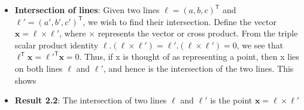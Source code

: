 \documentclass{report}
\begin{document}
\begin{itemize}
            \begin{align*}
                [a,b,c,] = a \cdot (b\times c)
            \end{align*}
            is called the \textbf{scalar triple product}. Its absolute value equals the volume of the parallelepiped spanned by $a,b,c$. We have
            \begin{align*}
                a \cdot (b\times c) = b \cdot (c\times a) = c \cdot (a\times b)
            .\end{align*}
            Further,
            \begin{align*}
                a \cdot (b\times c) = -b \cdot (a\times c) = -c \cdot (b\times a) = -a \cdot (c \times b)
            ,\end{align*}
            and 
            \begin{align*}
                [a,b,c] = 0
            \end{align*}
            if any two vectors are equal parallel, or if $a,b,c$ are coplanar. 
            \bigbreak \noindent 
            Lastly, we have that
            \begin{align*}
                [a,b,c] = \det \begin{pmatrix} a^{T} \\ b^{T} \\ c^{T} \end{pmatrix} = \det \begin{pmatrix} a_{1} & a_{2} & a_{3} \\ b_{1} & b_{2} & b_{3} \\ c_{1} & c_{2} & c_{3} \end{pmatrix}
            .\end{align*}
        \item \textbf{Intersection of lines}: Given two lines $\mathbf{\ell}=(a, b, c)^{\mathsf{T}}$ and $\ell'=(a', b', c')^{\mathsf{T}}$, we wish to find their intersection. Define the vector $\mathbf{x}=\ell\times \ell'$, where $\times $ represents the vector or cross product. From the triple scalar product identity $\ell.(\ell\times \ell')=\ell'.(\ell\times \ell')=0$, we see that $\ell^{\mathsf{T}}\mathbf{x}=\ell'^{\mathsf{T}}\mathbf{x}=0$. Thus, if x is thought of as representing a point, then x lies on both lines $\ell$ and $\ell'$, and hence is the intersection of the two lines. This shows
        \item \textbf{Result 2.2}: The intersection of two lines $\mathbf{\ell}$ and $\ell'$ is the point $\mathbf{x}=\ell\times \ell'$
            \bigbreak \noindent 

\end{itemize}
\end{document}
